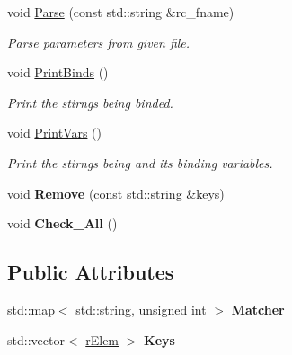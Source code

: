 \begin{DoxyCompactItemize}
\item 
void \hyperlink{classParser_a9df4698487e5b291314e06513d631313}{Parse} (const std\+::string \&rc\+\_\+fname)
\begin{DoxyCompactList}\small\item\em Parse parameters from given file. \end{DoxyCompactList}\item 
void \hyperlink{classParser_aa7cd392e8eabcf38e91d94f5e44d5cd2}{Print\+Binds} ()\hypertarget{classParser_aa7cd392e8eabcf38e91d94f5e44d5cd2}{}\label{classParser_aa7cd392e8eabcf38e91d94f5e44d5cd2}

\begin{DoxyCompactList}\small\item\em Print the stirngs being binded. \end{DoxyCompactList}\item 
void \hyperlink{classParser_a075c412b68aa4493232b7d13d4a1ca3f}{Print\+Vars} ()
\begin{DoxyCompactList}\small\item\em Print the stirngs being and its binding variables. \end{DoxyCompactList}\item 
void {\bfseries Remove} (const std\+::string \&keys)\hypertarget{classParser_ac02e205bd7e52ac24c35f9d1aa74a419}{}\label{classParser_ac02e205bd7e52ac24c35f9d1aa74a419}

\item 
void {\bfseries Check\+\_\+\+All} ()\hypertarget{classParser_a3cfacca735213fc62696d7ff24bed6ec}{}\label{classParser_a3cfacca735213fc62696d7ff24bed6ec}

\end{DoxyCompactItemize}
\subsection*{Public Attributes}
\begin{DoxyCompactItemize}
\item 
std\+::map$<$ std\+::string, unsigned int $>$ {\bfseries Matcher}\hypertarget{classParser_a6d9aacba48a3a145fdf0b88e703d7b53}{}\label{classParser_a6d9aacba48a3a145fdf0b88e703d7b53}

\item 
std\+::vector$<$ \hyperlink{structParser_1_1rElem}{r\+Elem} $>$ {\bfseries Keys}\hypertarget{classParser_ad1903e09aef42075e0643303d7767a40}{}\label{classParser_ad1903e09aef42075e0643303d7767a40}

\end{DoxyCompactItemize}


